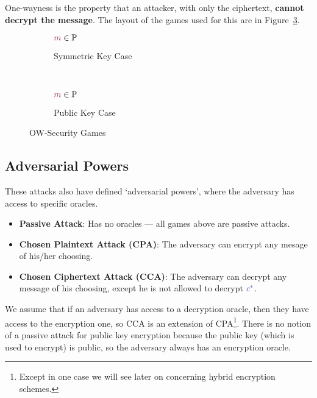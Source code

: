 One-wayness is the property that an attacker, with only the ciphertext, \textbf{cannot decrypt the message}. The layout of the games used for this are in Figure~\ref{fig:ow-sec}.

\begin{figure}[htp!]
    \centering
    \begin{subfigure}[b]{0.4\textwidth}
        \centering
        \begin{cryptogame}{$\cm\in \mathbb{P}$}
        \end{cryptogame}
        \caption{Symmetric Key  Case}
        \label{fig:ow-sec-sym}
    \end{subfigure}
    ~
    \begin{subfigure}[b]{0.4\textwidth}
        \centering
        \begin{cryptogame}{$\cm\in \mathbb{P}$}
            \cgameright{$\cpk$}
        \end{cryptogame}
        \caption{Public Key Case}
        \label{fig:ow-sec-pub}
    \end{subfigure}
    \caption{OW-Security Games}
    \label{fig:ow-sec}
\end{figure}

\subsection{Adversarial Powers}
These attacks also have defined `adversarial powers', where the adversary has access to specific oracles.
\begin{itemize}
    \item \textbf{Passive Attack}: Has no oracles --- all games above are passive attacks.
    \item \textbf{Chosen Plaintext Attack (CPA)}: The adversary can encrypt any mesage of his/her choosing.
    \item \textbf{Chosen Ciphertext Attack (CCA)}: The adversary can decrypt any message of his choosing, except he is not allowed to decrypt $\ccast$.
\end{itemize}
We assume that if an adversary has access to a decryption oracle, then they have access to the encryption one, so CCA is an extension of CPA\footnote{Except in one case we will see later on concerning hybrid encryption schemes.}. There is no notion of a passive attack for public key encryption because the public key (which is used to encrypt) is public, so the adversary always has an encryption oracle.

